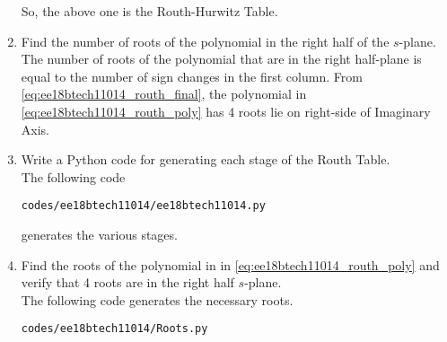 \begin{enumerate}[label=\thesubsection.\arabic*.,ref=\thesubsection.\theenumi]
So, the above one is the Routh-Hurwitz Table.

\item Find the number of roots of the polynomial in the right half of the $s$-plane.
\\
\solution The number of roots of the polynomial that are in the right half-plane is equal to
the number of sign changes in the first column. From \ref{eq:ee18btech11014_routh_final},
the polynomial in \eqref{eq:ee18btech11014_routh_poly}
has 4 roots lie on right-side of Imaginary Axis.

\item Write a Python code for generating each stage of the Routh Table.
\\
\solution The following code 
\begin{lstlisting}
codes/ee18btech11014/ee18btech11014.py
\end{lstlisting}
%
generates the various stages.
%

\item Find the roots of the polynomial in in \eqref{eq:ee18btech11014_routh_poly} and verify that 4 roots are in the right half $s$-plane.
\\
\solution The following code generates the necessary roots.
\begin{lstlisting}
codes/ee18btech11014/Roots.py
\end{lstlisting}
\end{enumerate}
